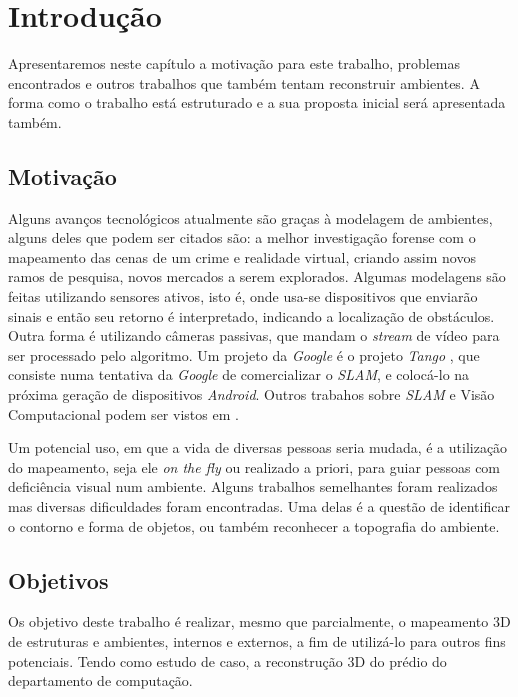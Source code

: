 \chapter{Introdução}

Apresentaremos neste capítulo a motivação para este trabalho, problemas encontrados e outros trabalhos que também tentam reconstruir ambientes. A forma como o trabalho está estruturado e a sua proposta inicial será apresentada também.

\section{Motivação}

Alguns avanços tecnológicos atualmente são graças à modelagem de ambientes, alguns deles que podem ser citados são: a melhor investigação forense com o mapeamento das cenas de um crime \cite{FIT3D} e realidade virtual, criando assim novos ramos de pesquisa, novos mercados a serem explorados. Algumas modelagens são feitas utilizando sensores ativos, isto é, onde usa-se dispositivos que enviarão sinais e então seu retorno é interpretado, indicando a localização de obstáculos. Outra forma é utilizando câmeras passivas, que mandam o \textit{stream} de vídeo para ser processado pelo algoritmo. Um projeto da \textit{Google} é o projeto \textit{Tango} \cite{Tango}, que consiste numa tentativa da \textit{Google} de comercializar o \textit{SLAM}, e colocá-lo na próxima geração de dispositivos \textit{Android}. Outros trabahos sobre \textit{SLAM} e Visão Computacional podem ser vistos em \cite{Trabalhos-Geral-SLAM}.

Um potencial uso, em que a vida de diversas pessoas seria mudada, é a utilização do mapeamento, seja ele \textit{on the fly} ou realizado a priori, para guiar pessoas com deficiência visual num ambiente. Alguns trabalhos semelhantes foram realizados mas diversas dificuldades foram encontradas. Uma delas é a questão de identificar o contorno e forma de objetos, ou também reconhecer a topografia do ambiente. 

\section{Objetivos}

Os objetivo deste trabalho é realizar, mesmo que parcialmente, o mapeamento 3D de estruturas e ambientes, internos e externos, a fim de utilizá-lo para outros fins potenciais. Tendo como estudo de caso, a reconstrução 3D do prédio do departamento de computação.

